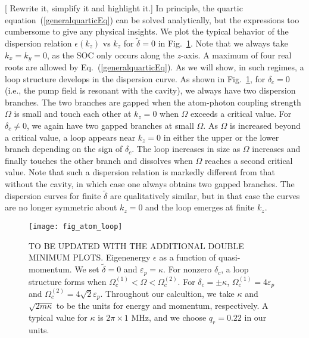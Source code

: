 \documentclass[atoms,article,submit,moreauthors,pdftex,12pt,a4paper]{mdpi}
\begin{document}
[{\color{red} Rewrite it, simplify it and highlight it.}] In principle, the quartic equation~(\ref{generalquarticEq}) can be solved analytically, but the expressions too cumbersome to give any physical insights. We plot the typical behavior of the dispersion relation $\epsilon({ k_z})$ vs $k_z$ for $\tilde{\delta}=0$ in Fig.~\ref{atomloops}. Note that we always take $k_x =k_y=0$, as the SOC only occurs along the $z$-axis. A maximum of four real roots are allowed by Eq.~(\ref{generalquarticEq}). As we will show, in such regimes, a loop structure develops in the dispersion curve.
As shown in Fig.~\ref{atomloops}, for $\delta_c=0$ (i.e., the pump field is resonant with the cavity), we always have two dispersion branches. The two branches are gapped when the atom-photon coupling strength $\Omega$ is small and touch each other at $k_z=0$ when $\Omega$ exceeds a critical value. For $\delta_c \neq 0$, we again have two gapped branches at small $\Omega$. As $\Omega$ is increased beyond a critical value, a loop appears near $k_z=0$ in either the upper or the lower branch depending on the sign of $\delta_c$. The loop increases in size as $\Omega$ increases and finally touches the other branch and dissolves when $\Omega$ reaches a second critical value. Note that such a dispersion relation is markedly different from that without the cavity, in which case one always obtains two gapped branches. The dispersion curves for finite $\tilde{\delta}$ are qualitatively similar, but in that case the curves are no longer symmetric about $k_z=0$ and the loop emerges  at finite $k_z$. 

\begin{figure}[htp]
\texttt{[image: fig\_atom\_loop]}\caption{{\color{red} TO BE UPDATED WITH THE ADDITIONAL DOUBLE MINIMUM PLOTS.} Eigenenergy $\epsilon$ as a function of quasi-momentum. We set $\tilde{\delta}=0$ and $\varepsilon_p=\kappa$. For nonzero $\delta_c$, a loop structure forms when $\Omega_c^{(1)} < \Omega < \Omega_c ^{(2)}$. For $\delta_c=\pm\kappa$, $\Omega_c^{(1)}=4\varepsilon_p$ and $\Omega_c^{(2)}= 4\sqrt{2}\varepsilon_p$. Throughout our calcultion, we take $\kappa$ and $\sqrt{2m\kappa}$ to be the units for energy and momentum, respectively. A typical value for $\kappa$ is $2\pi \times 1$ MHz, and we choose $q_r=0.22$ in our units. }\label{atomloops}
\end{figure}
\end{document}
